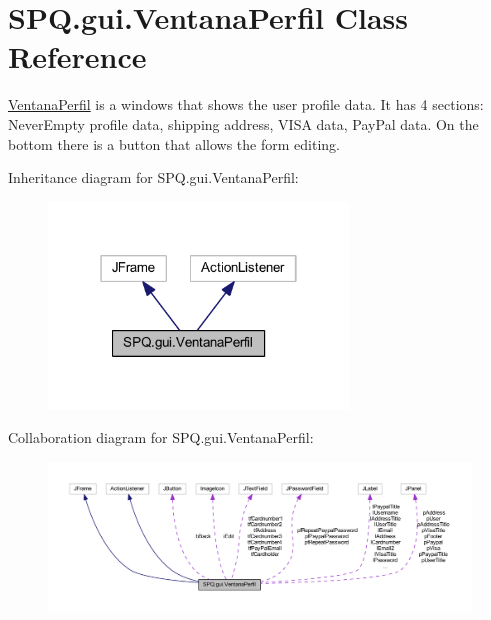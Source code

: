 \hypertarget{class_s_p_q_1_1gui_1_1_ventana_perfil}{}\section{S\+P\+Q.\+gui.\+Ventana\+Perfil Class Reference}
\label{class_s_p_q_1_1gui_1_1_ventana_perfil}


\mbox{\hyperlink{class_s_p_q_1_1gui_1_1_ventana_perfil}{Ventana\+Perfil}} is a windows that shows the user profile data. It has 4 sections\+: Never\+Empty profile data, shipping address, V\+I\+SA data, Pay\+Pal data. On the bottom there is a button that allows the form editing.  




Inheritance diagram for S\+P\+Q.\+gui.\+Ventana\+Perfil\+:
\nopagebreak
\begin{figure}[H]
\begin{center}
\leavevmode
\includegraphics[width=226pt]{class_s_p_q_1_1gui_1_1_ventana_perfil__inherit__graph}
\end{center}
\end{figure}


Collaboration diagram for S\+P\+Q.\+gui.\+Ventana\+Perfil\+:
\nopagebreak
\begin{figure}[H]
\begin{center}
\leavevmode
\includegraphics[width=350pt]{class_s_p_q_1_1gui_1_1_ventana_perfil__coll__graph}
\end{center}
\end{figure}
